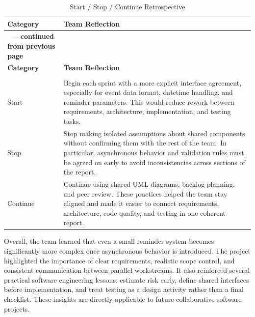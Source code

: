 \begin{xltabular}{\textwidth}{|>{\raggedright\arraybackslash{}}p{0.2\textwidth}|>{\raggedright\arraybackslash{}}X|}
    \caption{Start / Stop / Continue Retrospective} \label{tab:retrospective} \\
    \hline
    \textbf{Category} & \textbf{Team Reflection} \\
    \hline
    \endfirsthead

    {{\bfseries \tablename\ \thetable{} -- continued from previous page}} \\
    \hline
    \textbf{Category} & \textbf{Team Reflection} \\
    \hline
    \endhead

    \hline
     \\
    \hline
    \endfoot

    \hline
    \endlastfoot

    Start &
    Begin each sprint with a more explicit interface agreement, especially for event data format, datetime handling, and reminder parameters. This would reduce rework between requirements, architecture, implementation, and testing tasks. \\
    \hline
    Stop &
    Stop making isolated assumptions about shared components without confirming them with the rest of the team. In particular, asynchronous behavior and validation rules must be agreed on early to avoid inconsistencies across sections of the report. \\
    \hline
    Continue &
    Continue using shared UML diagrams, backlog planning, and peer review. These practices helped the team stay aligned and made it easier to connect requirements, architecture, code quality, and testing in one coherent report. \\
    \hline
\end{xltabular}

Overall, the team learned that even a small reminder system becomes significantly more complex once asynchronous behavior is introduced. The project highlighted the importance of clear requirements, realistic scope control, and consistent communication between parallel workstreams. It also reinforced several practical software engineering lessons: estimate risk early, define shared interfaces before implementation, and treat testing as a design activity rather than a final checklist. These insights are directly applicable to future collaborative software projects.
